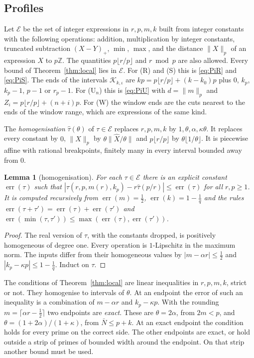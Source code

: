 \documentclass[11pt]{amsart}
\newtheorem{lemma}[theorem]{Lemma}
\theoremstyle{definition}
\theoremstyle{remark}
\numberwithin{equation}{section}
\newcommand{\Z}{\mathbb Z}
\newcommand{\err}{\operatorname{err}}
\begin{document}
\subsection{Profiles}\label{ssec:profiles}
Let $\mathcal E$ be the set of integer expressions in $r,p,m,k$ built from integer constants with the following
operations: addition, multiplication by integer constants, truncated subtraction $(X-Y)_+$, $\min$, $\max$, and the
distance $\|X\|_p$ of an expression $X$ to $p\Z$. The quantities $p\lfloor r/p\rfloor$ and $r\bmod p$ are also allowed.
Every bound of Theorem~\ref{thm:local} lies in $\mathcal E$. For (R) and (S) this is \eqref{eq:PiR} and \eqref{eq:PiS}.
The ends of the intervals $\mathcal K_{k,\iota}$ are $kp=p\lfloor r/p\rfloor+(k-k_0)p$ plus $0$, $k_p$, $k_p-1$, $p-1$ or
$r_p-1$. For (U$_n$) this is \eqref{eq:PiU} with $d=\|m\|_p$ and $Z_i=p\lfloor r/p\rfloor+(n+i)p$. For (W) the window
ends are the cuts nearest to the ends of the window range, which are expressions of the same kind.

The \emph{homogenisation} $\hat\tau(\theta)$ of $\tau\in\mathcal E$ replaces $r,p,m,k$ by $1,\theta,\alpha,\kappa\theta$.
It replaces every constant by $0$, $\|X\|_p$ by $\theta\|\hat X/\theta\|$ and $p\lfloor r/p\rfloor$ by
$\theta\lfloor1/\theta\rfloor$. It is piecewise affine with rational breakpoints, finitely many in every interval bounded
away from $0$.

\begin{lemma}[homogenisation]\label{lem:homog}
For each $\tau\in\mathcal E$ there is an explicit constant $\err(\tau)$ such that
$|\tau(r,p,m(r),k_p)-r\hat\tau(p/r)|\le\err(\tau)$ for all $r,p\ge1$. It is computed recursively from
$\err(m)=\frac12$, $\err(k)=1-\frac1q$ and the rules $\err(\tau+\tau')=\err(\tau)+\err(\tau')$ and
$\err(\min(\tau,\tau'))\le\max(\err(\tau),\err(\tau'))$.
\end{lemma}
\begin{proof}
The real version of $\tau$, with the constants dropped, is positively homogeneous of degree one. Every operation is
$1$-Lipschitz in the maximum norm. The inputs differ from their homogeneous values by $|m-\alpha r|\le\frac12$ and
$|k_p-\kappa p|\le1-\frac1q$. Induct on $\tau$.
\end{proof}

The conditions of Theorem~\ref{thm:local} are linear inequalities in $r,p,m,k$, strict or not. They homogenise to
intervals of $\theta$. At an endpoint the error of such an inequality is a combination of $m-\alpha r$ and $k_p-\kappa p$.
With the rounding $m=\lceil\alpha r-\frac12\rceil$ two endpoints are \emph{exact}. These are $\theta=2\alpha$, from
$2m<p$, and $\theta=(1+2\alpha)/(1+\kappa)$, from $\bar N\le p+k$. At an exact endpoint the condition holds for every prime on
the correct side. The other endpoints are exact, or hold outside a strip of primes of bounded width around the endpoint.
On that strip another bound must be used.
\end{document}
